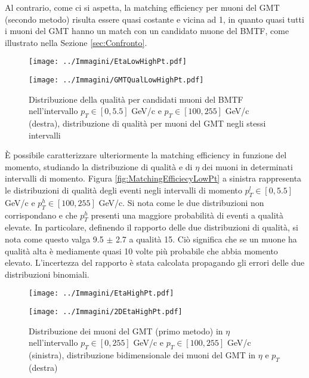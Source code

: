 Al contrario, come ci si aspetta, la matching efficiency per muoni del GMT (secondo metodo) risulta essere quasi costante e vicina ad 1, in quanto quasi tutti i muoni del GMT hanno un match con un candidato muone del BMTF, come illustrato nella Sezione \ref{sec:Confronto}. 


\begin{figure}[t]
  \centering
  \begin{minipage}[b]{0.45\textwidth}
    \centering
    \texttt{[image: ../Immagini/EtaLowHighPt.pdf]} 
    \end{minipage}
    \hfill 
    \begin{minipage}[b]{0.45\textwidth}
      \centering
      \texttt{[image: ../Immagini/GMTQualLowHighPt.pdf]} 
    \end{minipage}
    \caption{Distribuzione della qualità per candidati muoni del BMTF nell'intervallo $p_T \in [0, 5.5]$ GeV/c e $p_T \in [100, 255]$ GeV/c (destra), distribuzione di qualità per muoni del GMT negli stessi intervalli}
  \label{fig:QualEtaLowHighPt}
\end{figure}

È possibile caratterizzare ulteriormente la matching efficiency in funzione del momento, studiando la distribuzione di qualità e di $\eta$ dei muoni in determinati intervalli di momento. Figura \ref{fig:MatchingEfficiecyLowPt} a sinistra rappresenta le distribuzioni di qualità degli eventi negli intervalli di momento $p_T^l \in [0, 5.5]$ GeV/c e $p_T^h \in [100, 255]$ GeV/c. Si nota come le due distribuzioni non corrispondano e che $p_T^h$ presenti una maggiore probabilità di eventi a qualità elevate. In particolare, definendo il rapporto delle due distribuzioni di qualità, si nota come questo valga 9.5 $\pm$ 2.7 a qualità 15. Ciò significa che se un muone ha qualità alta è mediamente quasi 10 volte più probabile che abbia momento elevato. L'incertezza del rapporto è stata calcolata propagando gli errori delle due distribuzioni binomiali.

\begin{figure}[t]
  \centering
  \begin{minipage}[b]{0.47\textwidth}
    \centering
    \texttt{[image: ../Immagini/EtaHighPt.pdf]} 
    \end{minipage}
    \hfill 
    \begin{minipage}[b]{0.51\textwidth}
      \centering
      \texttt{[image: ../Immagini/2DEtaHighPt.pdf]}
    \end{minipage}
    \caption{Distribuzione dei muoni del GMT (primo metodo) in $\eta$  nell'intervallo $p_T \in [0, 255]$ GeV/c e $p_T \in [100, 255]$ GeV/c (sinistra), distribuzione bidimensionale dei muoni del GMT in $\eta$ e $p_T$ (destra)}
  \label{fig:MatchingEfficiecyPt2}
\end{figure}

